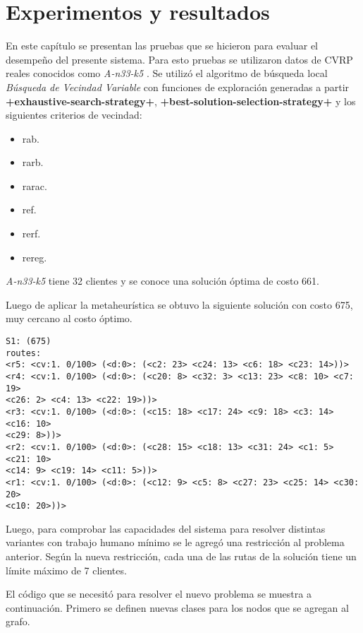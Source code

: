 \chapter{Experimentos y resultados}\label{chapter:Results}

En este capítulo se presentan las pruebas que se hicieron para evaluar el desempeño del presente sistema. Para esto pruebas se utilizaron datos de CVRP reales conocidos como \textit{A-n33-k5} \cite{TODO}. Se utilizó el algoritmo de búsqueda local \textit{Búsqueda de Vecindad Variable} \cite{TODO} con funciones de exploración generadas a partir \textbf{+exhaustive-search-strategy+}, \textbf{+best-solution-selection-strategy+} y los siguientes criterios de vecindad:

\begin{itemize}
	\item rab.
	\item rarb.
	\item rarac.
	\item ref.
	\item rerf.
	\item rereg.
\end{itemize}


\textit{A-n33-k5} tiene 32 clientes y se conoce una solución óptima de costo 661.

Luego de aplicar la metaheurística se obtuvo la siguiente solución con costo 675, muy cercano al costo óptimo.

\begin{lstlisting}
S1: (675)
routes:
<r5: <cv:1. 0/100> (<d:0>: (<c2: 23> <c24: 13> <c6: 18> <c23: 14>))>
<r4: <cv:1. 0/100> (<d:0>: (<c20: 8> <c32: 3> <c13: 23> <c8: 10> <c7: 19>
<c26: 2> <c4: 13> <c22: 19>))>
<r3: <cv:1. 0/100> (<d:0>: (<c15: 18> <c17: 24> <c9: 18> <c3: 14> <c16: 10>
<c29: 8>))>
<r2: <cv:1. 0/100> (<d:0>: (<c28: 15> <c18: 13> <c31: 24> <c1: 5> <c21: 10>
<c14: 9> <c19: 14> <c11: 5>))>
<r1: <cv:1. 0/100> (<d:0>: (<c12: 9> <c5: 8> <c27: 23> <c25: 14> <c30: 20>
<c10: 20>))>
\end{lstlisting}

Luego, para comprobar las capacidades del sistema para resolver distintas variantes con trabajo humano mínimo se le agregó una restricción al problema anterior. Según la nueva restricción, cada una de las rutas de la solución tiene un límite máximo de 7 clientes. 

El código que se necesitó para resolver el nuevo problema se muestra a continuación. Primero se definen nuevas clases para los nodos que se agregan al grafo.

